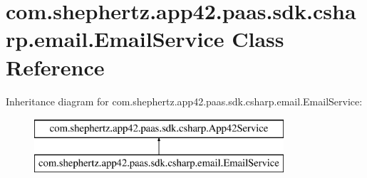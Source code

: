 \hypertarget{classcom_1_1shephertz_1_1app42_1_1paas_1_1sdk_1_1csharp_1_1email_1_1_email_service}{\section{com.\+shephertz.\+app42.\+paas.\+sdk.\+csharp.\+email.\+Email\+Service Class Reference}
\label{classcom_1_1shephertz_1_1app42_1_1paas_1_1sdk_1_1csharp_1_1email_1_1_email_service}
}
Inheritance diagram for com.\+shephertz.\+app42.\+paas.\+sdk.\+csharp.\+email.\+Email\+Service\+:\begin{figure}[H]
\begin{center}
\leavevmode
\includegraphics[height=2.000000cm]{classcom_1_1shephertz_1_1app42_1_1paas_1_1sdk_1_1csharp_1_1email_1_1_email_service}
\end{center}
\end{figure}
